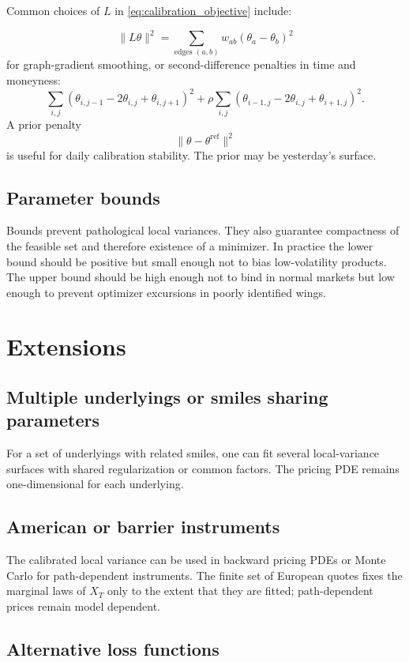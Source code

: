 \documentclass[11pt]{article}
\newcommand{\1}{\mathbf{1}}
\begin{document}
Common choices of $L$ in \eqref{eq:calibration_objective} include:

\[
  \|L\theta\|^2
  =
  \sum_{\text{edges }(a,b)}w_{ab}(\theta_a-\theta_b)^2
\]
for graph-gradient smoothing, or second-difference penalties in time and moneyness:
\[
  \sum_{i,j}\left(\theta_{i,j-1}-2\theta_{i,j}+\theta_{i,j+1}\right)^2
  +
  \rho\sum_{i,j}\left(\theta_{i-1,j}-2\theta_{i,j}+\theta_{i+1,j}\right)^2.
\]
A prior penalty
\[
  \|\theta-\theta^{\mathrm{ref}}\|^2
\]
is useful for daily calibration stability. The prior may be yesterday's surface.

\subsection{Parameter bounds}

Bounds prevent pathological local variances. They also guarantee compactness of the
feasible set and therefore existence of a minimizer. In practice the lower bound should
be positive but small enough not to bias low-volatility products. The upper bound should
be high enough not to bind in normal markets but low enough to prevent optimizer
excursions in poorly identified wings.

\section{Extensions}

\subsection{Multiple underlyings or smiles sharing parameters}

For a set of underlyings with related smiles, one can fit several local-variance surfaces
with shared regularization or common factors. The pricing PDE remains one-dimensional for
each underlying.

\subsection{American or barrier instruments}

The calibrated local variance can be used in backward pricing PDEs or Monte Carlo for
path-dependent instruments. The finite set of European quotes fixes the marginal laws of
$X_T$ only to the extent that they are fitted; path-dependent prices remain model
dependent.

\subsection{Alternative loss functions}
\end{document}
